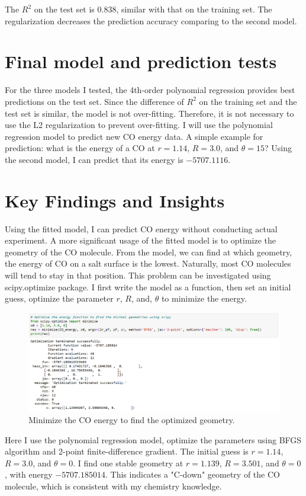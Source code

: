 \documentclass[11pt]{article}
\begin{document}
The $R^2$ on the test set is 0.838, similar with that on the training set.
The regularization decreases the prediction accuracy comparing to the second model.

\section{Final model and prediction tests}\label{section-pred}
For the three models I tested, the 4th-order polynomial regression provides best predictions on the test set.
Since the difference of $R^2$ on the training set and the test set is similar, the model is not over-fitting.
Therefore, it is not necessary to use the L2 regularization to prevent over-fitting.
I will use the polynomial regression model to predict new CO energy data.
A simple example for prediction: what is the energy of a CO at $r=1.14$, $R=3.0$, and $\theta = 15$?
Using the second model, I can predict that its energy is $-5707.1116$.

\section{Key Findings and Insights}\label{section-find}
Using the fitted model, I can predict CO energy without conducting actual experiment.
A more significant usage of the fitted model is to optimize the geometry of the CO molecule.
From the model, we can find at which geometry, the energy of CO on a salt surface is the lowest.
Naturally, most CO molecules will tend to stay in that position.
This problem can be investigated using scipy.optimize package.
I first write the model as a function, then set an initial guess, optimize the parameter $r$, $R$, and, $\theta$ to minimize the energy.
\begin{figure}[h]
\centerline{\includegraphics[scale=0.31]{opt.png}}
\caption{Minimize the CO energy to find the optimized geometry.}
\end{figure}

Here I use the polynomial regression model, optimize the parameters using BFGS algorithm and 2-point finite-difference gradient.
The initial guess is $r=1.14$, $R=3.0$, and $\theta = 0$.
I find one stable geometry at $r=1.139$, $R=3.501$, and $\theta = 0$, with energy $-5707.185014$.
This indicates a "C-down" geometry of the CO molecule, which is consistent with my chemistry knowledge.
\end{document}

